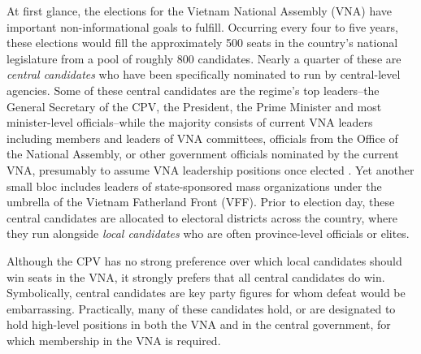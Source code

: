 \documentclass[12pt]{article}
\newcommand\fnote[1]{\footnote{\baselineskip=2\normalbaselineskip#1}}
\newcommand{\1}{\mathbbm{1}}
\let\footnote=\endnote
\begin{document}
At first glance, the elections for the Vietnam National Assembly (VNA) have important non-informational goals to fulfill. Occurring every four to five years, these elections would fill the approximately 500 seats in the country's national legislature from a pool of roughly 800 candidates. Nearly a quarter of these are \textit{central candidates} who have been specifically nominated to run by central-level agencies. Some of these central candidates are the regime's top leaders--the General Secretary of the CPV, the President, the Prime Minister and most minister-level officials--while the majority consists of current VNA leaders including members and leaders of VNA committees, officials from the Office of the National Assembly, or other government officials nominated by the current VNA, presumably to assume VNA leadership positions once elected \citep{MaleskySchuler2013, Schuler2020}. Yet another small bloc includes leaders of state-sponsored mass organizations under the umbrella of the Vietnam Fatherland Front (VFF). Prior to election day, these central candidates are allocated to electoral districts across the country, where they run alongside \textit{local candidates} who are often province-level officials or elites.


Although the CPV has no strong preference over which local candidates should win seats in the VNA, it strongly prefers that all central candidates do win. Symbolically, central candidates are key party figures for whom defeat would be embarrassing. Practically, many of these candidates hold, or are designated to hold high-level positions in both the VNA and in the central government, for which membership in the VNA is required. 
\end{document}
